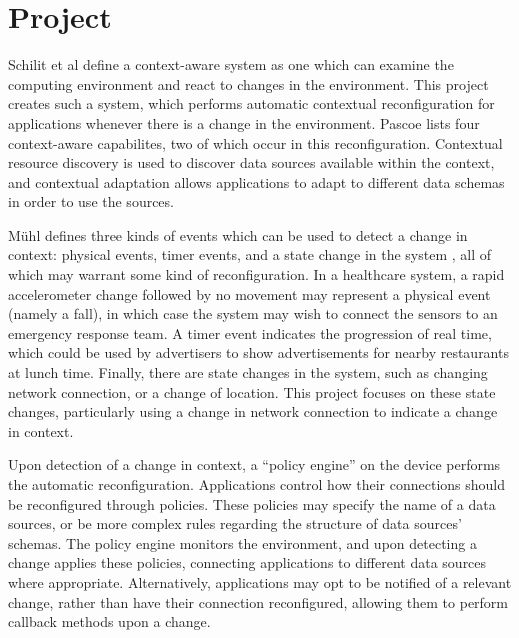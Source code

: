 \documentclass[12pt,twoside,notitlepage]{report}
\begin{document}
\section{Project}

Schilit et al \cite{Schilit:1994:CCA:1439278.1440041}  define a context-aware system as one which can examine the computing environment and react to changes in the environment. 
This project creates such a system, which performs automatic contextual reconfiguration for applications whenever there is a change in the environment. 
Pascoe \cite{Pascoe:1998:AGC:857199.858020} lists four context-aware capabilites, two of which occur in this reconfiguration. 
Contextual resource discovery is used to discover data sources available within the context, and contextual adaptation allows applications to adapt to different data schemas in order to use the sources.

M\"{u}hl defines three kinds of events which can be used to detect a change in context: physical events, timer events, and a state change in the system \cite[page 11]{Muhl:2006:DES:1162246}, all of which may warrant some kind of reconfiguration. 
In a healthcare system, a rapid accelerometer change followed by no movement may represent a physical event (namely a fall), in which case the system may wish to connect the sensors to an emergency response team.
A timer event indicates the progression of real time, which could be used by advertisers to show advertisements for nearby restaurants at lunch time. 
Finally, there are state changes in the system, such as changing network connection, or a change of location. 
This project focuses on these state changes, particularly using a change in network connection to indicate a change in context. 

Upon detection of a change in context, a ``policy engine'' on the device performs the automatic reconfiguration. 
Applications control how their connections should be reconfigured through policies. 
These policies may specify the name of a data sources, or be more complex rules regarding the structure of data sources' schemas. 
The policy engine monitors the environment, and upon detecting a change applies these policies, connecting applications to different data sources where appropriate.
Alternatively, applications may opt to be notified of a relevant change, rather than have their connection reconfigured, allowing them to perform callback methods upon a change.
\end{document}
